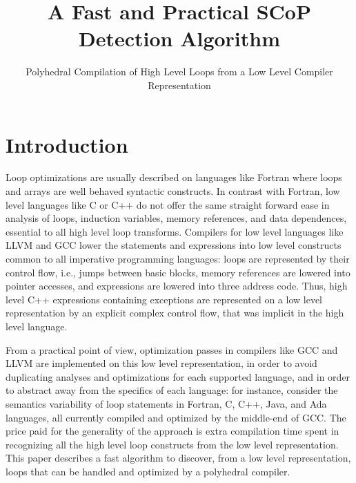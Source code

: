 \documentclass{sigplanconf}
\begin{document}
\setlength{\pdfpageheight}{\paperheight}
\setlength{\pdfpagewidth}{\paperwidth}


\title{A Fast and Practical SCoP Detection Algorithm}
\subtitle{Polyhedral Compilation of High Level Loops from a Low Level Compiler Representation}

\maketitle

\begin{abstract}

\end{abstract}

\section{Introduction}

Loop optimizations are usually described on languages like Fortran where loops
and arrays are well behaved syntactic constructs.  In contrast with Fortran, low
level languages like C or C++ do not offer the same straight forward ease in
analysis of loops, induction variables, memory references, and data dependences,
essential to all high level loop transforms.  Compilers for low level languages
like LLVM and GCC lower the statements and expressions into low level constructs
common to all imperative programming languages: loops are represented by their
control flow, i.e., jumps between basic blocks, memory references are lowered
into pointer accesses, and expressions are lowered into three address code.
Thus, high level C++ expressions containing exceptions are represented on a low
level representation by an explicit complex control flow, that was implicit in
the high level language.

From a practical point of view, optimization passes in compilers like GCC and
LLVM are implemented on this low level representation, in order to avoid
duplicating analyses and optimizations for each supported language, and in order
to abstract away from the specifics of each language: for instance, consider the
semantics variability of loop statements in Fortran, C, C++, Java, and Ada
languages, all currently compiled and optimized by the middle-end of GCC.  The
price paid for the generality of the approach is extra compilation time spent in
recognizing all the high level loop constructs from the low level
representation.  This paper describes a fast algorithm to discover, from a low
level representation, loops that can be handled and optimized by a polyhedral
compiler.
\end{document}
